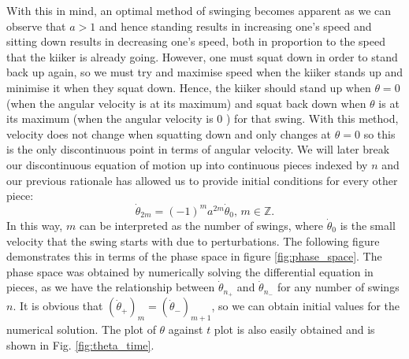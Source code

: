 \documentclass[12pt]{article}
\begin{document}
With this in mind, an optimal method of swinging becomes apparent as we can observe that $a >1$ and hence standing results in increasing one's speed and sitting down results in decreasing one's speed, both in proportion to the speed that the kiiker is already going. However, one must squat down in order to stand back up again, so we must try and maximise speed when the kiiker stands up and minimise it when they squat down. Hence, the kiiker should stand up when $\theta = 0$ (when the angular velocity is at its maximum) and squat back down when $\theta$ is at its maximum (when the angular velocity is 0 ) for that swing. With this method, velocity does not change when squatting down and only changes at $\theta = 0$ so this is the only discontinuous point in terms of angular velocity. We will later break our discontinuous equation of motion up into continuous pieces indexed by $n$ and our previous rationale has allowed us to provide initial conditions for every other piece:
\begin{equation}
    \dot{\theta}_{2m} = (-1)^ma^{2m}\dot{\theta}_0, \, m \in \mathbb{Z}.
\end{equation}
In this way, $m$ can be interpreted as the number of swings, where $\dot{\theta}_0$ is the small velocity that the swing starts with due to perturbations. The following figure demonstrates this in terms of the phase space in figure \ref{fig:phase_space}. The phase space was obtained by numerically solving the differential equation in pieces, as we have the relationship between $\dot\theta_{n_+}$ and $\dot\theta_{n_-}$ for any number of swings $n$. It is obvious that $(\dot\theta_{+})_m = (\dot\theta_-)_{m+1}$, so we can obtain initial values for the numerical solution. The plot of $\theta$ against $t$ plot is also easily obtained and is shown in Fig. \ref{fig:theta_time}.
\end{document}
